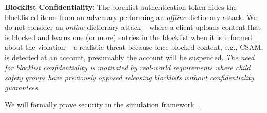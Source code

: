 	\item \textbf{Blocklist Confidentiality:} The blocklist authentication token \blklistToken{\blocklist} hides the 
	blocklisted items from an adversary performing an \emph{offline} dictionary attack.  We do not consider an \emph{online} dictionary attack -- where a client uploads content that is blocked and learns one (or more) entries in the blocklist when it is informed about the violation -- a realistic threat because once blocked content, e.g., CSAM, is detected at an account, presumably the account will be suspended. \emph{The need for blocklist confidentiality is motivated by real-world requirements where child safety groups have previously opposed releasing blocklists without confidentiality guarantees}. 
	
\enumListEnd




%
We will formally prove security in the simulation framework~\cite{lindell2017simulate}. 




